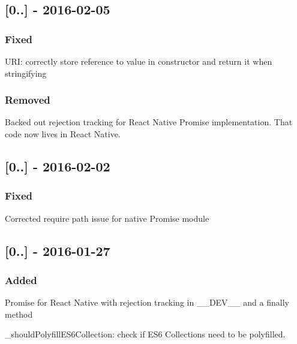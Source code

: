 \subsection*{\mbox{[}0..\mbox{]} -\/ 2016-\/02-\/05}

\subsubsection*{Fixed}


\begin{DoxyItemize}
\item {\ttfamily U\+RI}\+: correctly store reference to value in constructor and return it when stringifying
\end{DoxyItemize}

\subsubsection*{Removed}


\begin{DoxyItemize}
\item Backed out rejection tracking for React Native {\ttfamily Promise} implementation. That code now lives in React Native.
\end{DoxyItemize}

\subsection*{\mbox{[}0..\mbox{]} -\/ 2016-\/02-\/02}

\subsubsection*{Fixed}


\begin{DoxyItemize}
\item Corrected require path issue for native {\ttfamily Promise} module
\end{DoxyItemize}

\subsection*{\mbox{[}0..\mbox{]} -\/ 2016-\/01-\/27}

\subsubsection*{Added}


\begin{DoxyItemize}
\item {\ttfamily Promise} for React Native with rejection tracking in {\ttfamily \+\_\+\+\_\+\+D\+E\+V\+\_\+\+\_\+} and a {\ttfamily finally} method
\item {\ttfamily \+\_\+should\+Polyfill\+E\+S6\+Collection}\+: check if E\+S6 Collections need to be polyfilled.
\end{DoxyItemize}

